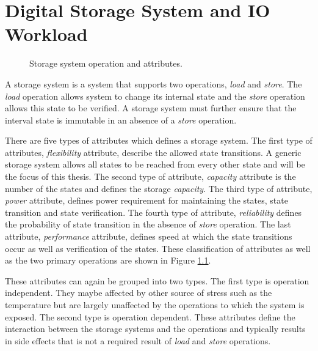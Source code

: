 \chapter{Digital Storage System and IO Workload}
\label{storage}
\begin{figure}[h]
\centering

\caption{Storage system operation and attributes.}
\label{fig:storageAttribute}
\end{figure}
A storage system is a system that supports two operations, \emph{load} and \emph{store}. 
The \emph{load} operation allows system to change its internal state and the \emph{store} operation allows this state to be verified. 
A storage system must further ensure that the interval state is immutable in an absence of a \emph{store} operation.

There are five types of attributes which defines a storage system. 
The first type of attributes, \emph{flexibility} attribute, describe the allowed state transitions. 
A generic storage system allows all states to be reached from every other state and will be the focus of this thesis. 
The second type of attribute, \emph{capacity} attribute is the number of the states and defines the storage \emph{capacity}.
The third type of attribute, \emph{power} attribute, defines power requirement for maintaining the states, state transition and state verification. 
The fourth type of attribute, \emph{reliability} defines the probability of state transition in the absence of \emph{store} operation. 
The last attribute, \emph{performance} attribute, defines speed at which the state transitions occur as well as verification of the states. 
These classification of attributes as well as the two primary operations are shown in Figure \ref{fig:storageAttribute}.

These attributes can again be grouped into two types. 
The first type is operation independent. 
They maybe affected by other source of stress such as the temperature but are largely unaffected by the operations to which the system is exposed. 
The second type is operation dependent. 
These attributes define the interaction between the storage systems and the operations and typically results in side effects that is not a required result of \emph{load} and \emph{store} operations. 

